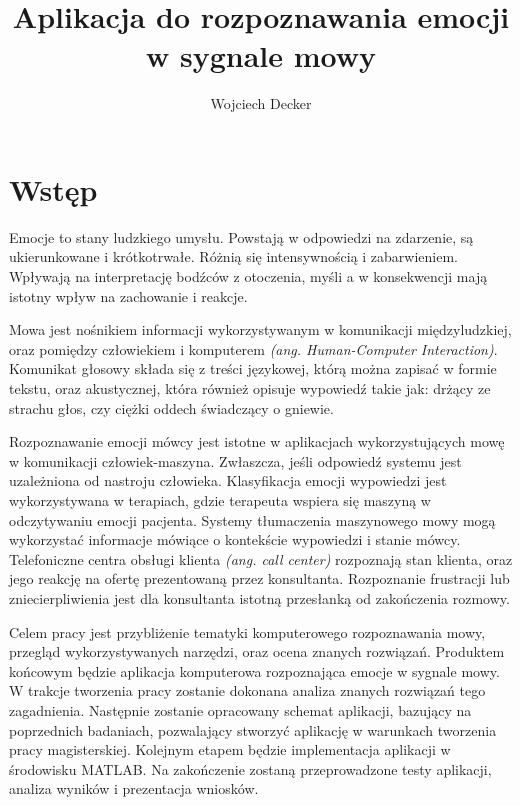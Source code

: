 \documentclass[a4paper,12pt,twoside,openany]{report}
\title{Aplikacja do rozpoznawania emocji w sygnale mowy}
\author{Wojciech Decker}
\newcommand{\ang}[1]{\textit{(ang. #1)}}
\begin{document}
\maketitle
\chapter{Wstęp}
\label{ch:wstep}
Emocje to stany ludzkiego umysłu.
Powstają w odpowiedzi na zdarzenie, są ukierunkowane i krótkotrwałe.
Różnią się intensywnością i zabarwieniem.
Wpływają na interpretację bodźców z otoczenia,
myśli a w konsekwencji mają istotny wpływ na zachowanie i reakcje.

Mowa jest nośnikiem informacji wykorzystywanym w komunikacji międzyludzkiej,
oraz pomiędzy człowiekiem i komputerem \ang{Human-Computer Interaction}.
Komunikat głosowy składa się z treści językowej,
którą można zapisać w formie tekstu,
oraz akustycznej, która również opisuje wypowiedź takie jak:
drżący ze strachu głos, czy ciężki oddech świadczący o gniewie.

Rozpoznawanie emocji mówcy jest istotne w aplikacjach wykorzystujących mowę w komunikacji człowiek-maszyna.
Zwłaszcza, jeśli odpowiedź systemu jest uzależniona od nastroju człowieka.
Klasyfikacja emocji wypowiedzi jest wykorzystywana w terapiach,
gdzie terapeuta wspiera się maszyną w odczytywaniu emocji pacjenta.
Systemy tłumaczenia maszynowego mowy mogą wykorzystać informacje mówiące o kontekście wypowiedzi i stanie mówcy.
Telefoniczne centra obsługi klienta \ang{call center} rozpoznają stan klienta,
oraz jego reakcję na ofertę prezentowaną przez konsultanta.
Rozpoznanie frustracji lub zniecierpliwienia jest dla konsultanta istotną przesłanką od zakończenia rozmowy.

Celem pracy jest przybliżenie tematyki komputerowego rozpoznawania mowy,
przegląd wykorzystywanych narzędzi, oraz ocena znanych rozwiązań.
Produktem końcowym będzie aplikacja komputerowa rozpoznająca emocje w sygnale mowy.
W trakcje tworzenia pracy zostanie dokonana analiza znanych rozwiązań tego zagadnienia.
Następnie zostanie opracowany schemat aplikacji, bazujący na poprzednich badaniach,
pozwalający stworzyć aplikację w warunkach tworzenia pracy magisterskiej.
Kolejnym etapem będzie implementacja aplikacji w środowisku MATLAB.
Na zakończenie zostaną przeprowadzone testy aplikacji,
analiza wyników i prezentacja wniosków.
\end{document}
